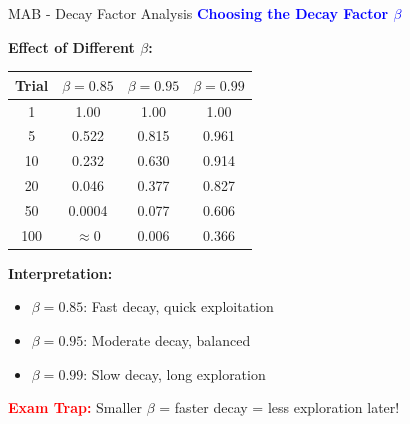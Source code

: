 \documentclass[8pt]{beamer}
\begin{document}
	\begin{frame}{MAB - Decay Factor Analysis}
		\fontsize{6.5}{7.5}\selectfont
		\textcolor{blue}{\textbf{Choosing the Decay Factor $\beta$}}
		
		\textbf{Effect of Different $\beta$:}
		
		\begin{tabular}{|c|c|c|c|}
			\hline
			\textbf{Trial} & $\beta=0.85$ & $\beta=0.95$ & $\beta=0.99$ \\
			\hline
			1 & 1.00 & 1.00 & 1.00 \\
			\hline
			5 & 0.522 & 0.815 & 0.961 \\
			\hline
			10 & 0.232 & 0.630 & 0.914 \\
			\hline
			20 & 0.046 & 0.377 & 0.827 \\
			\hline
			50 & 0.0004 & 0.077 & 0.606 \\
			\hline
			100 & $\approx$0 & 0.006 & 0.366 \\
			\hline
		\end{tabular}
		
		\textbf{Interpretation:}
		\begin{itemize}
			\item $\beta = 0.85$: Fast decay, quick exploitation
			\item $\beta = 0.95$: Moderate decay, balanced
			\item $\beta = 0.99$: Slow decay, long exploration
		\end{itemize}
		
		\textcolor{red}{\textbf{Exam Trap:}} Smaller $\beta$ = faster decay = less exploration later!
	\end{frame}
	
\end{document}
